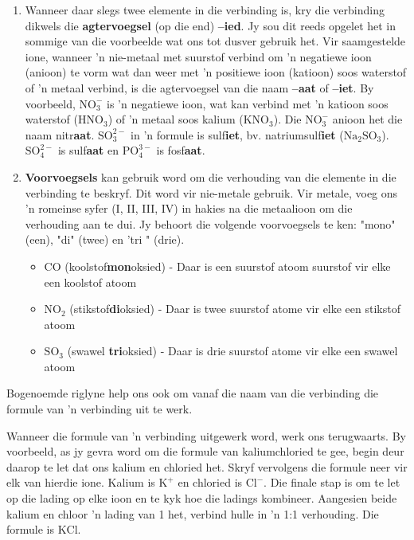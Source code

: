 \begin{enumerate}[noitemsep, label=\textbf{\arabic*}. ]
\begin{table}[H]
\begin{center}
 \end{center}
\caption{Tabel van anione}
\label{tab:anions}
\end{table}

    \par
  \label{m38708*uid42}\item Wanneer daar slegs twee elemente in die verbinding is, kry die verbinding dikwels die \textbf{agtervoegsel} (op die end) \textbf{–ied}. Jy sou dit reeds opgelet het in sommige van die voorbeelde wat ons tot dusver gebruik het. Vir saamgestelde ione, wanneer 'n nie-metaal met suurstof verbind om 'n negatiewe ioon (anioon) te vorm wat dan weer met 'n positiewe ioon (katioon) soos waterstof of 'n metaal verbind, is die agtervoegsel van die naam \textbf{–aat} of \textbf{–iet}. By voorbeeld, $\text{NO}_{3}^{-}$ is 'n negatiewe ioon, wat kan verbind met 'n katioon soos waterstof ($\text{HNO}{}_{3}$) of 'n metaal soos kalium ($\text{KNO}{}_{3}$). Die $\text{NO}_{3}^{-}$ anioon het die naam nitr\textbf{aat}. $\text{SO}_{3}^{2-}$ in 'n formule is sulf\textbf{iet}, bv. natriumsulf\textbf{iet} ($\text{Na}{}_{2}\text{SO}{}_{3}$). $\text{SO}_{4}^{2-}$ is sulf\textbf{aat} en $\text{PO}_{4}^{3-}$ is fosf\textbf{aat}.
\label{m38708*uid43}\item \textbf{Voorvoegsels} kan gebruik word om die verhouding van die elemente in die verbinding te beskryf. Dit word vir nie-metale gebruik. Vir metale, voeg ons 'n romeinse syfer (I, II, III, IV) in hakies na die metaalioon om die verhouding aan te dui. Jy behoort die volgende voorvoegsels te ken: "mono" (een), "di" (twee) en 'tri " (drie).
\label{m38708*id64977}\begin{itemize}[noitemsep]
            \label{m38708*uid44}\item $\text{CO}$ (koolstof\textbf{mon}oksied) - Daar is een suurstof atoom suurstof vir elke een koolstof atoom
\label{m38708*uid45}\item $\text{NO}{}_{2}$ (stikstof\textbf{di}oksied) - Daar is twee suurstof atome vir elke een stikstof atoom
\label{m38708*uid46}\item $\text{SO}{}_{3}$ (swawel \textbf{tri}oksied) - Daar is drie suurstof atome vir elke een swawel atoom
\end{itemize}
        \end{enumerate}
\label{m38708*id537402}Bogenoemde riglyne help ons ook om vanaf die naam van die verbinding die formule van 'n verbinding uit te werk.\par 
\label{m38708*eip-178}Wanneer die formule van 'n verbinding uitgewerk word, werk ons terugwaarts. By voorbeeld, as jy gevra word om die formule van kaliumchloried te gee, begin deur daarop te let dat ons kalium en chloried het. Skryf vervolgens die formule neer vir elk van hierdie ione. Kalium is ${\text{K}}^{+}$ en chloried is ${\text{Cl}}^{-}$. Die finale stap is om te let op die lading op elke ioon en te kyk hoe die ladings kombineer. Aangesien beide kalium en chloor 'n lading van 1 het, verbind hulle in 'n 1:1 verhouding. Die formule is $\text{KCl}$.\par \label{m38708*notfhsst!!!underscore!!!id252}
